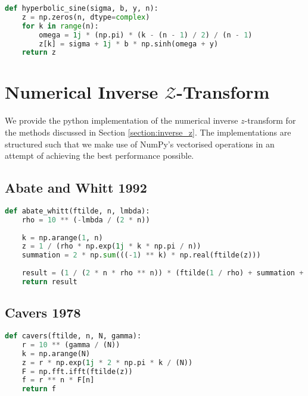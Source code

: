 \begin{appendices}
\begin{lstlisting}[language=Python, caption= Implementation of the conformal mapping (Equation \ref{equation:conformal_mapping}) from $-\frac{\pi}{2} \leq \omega \leq \frac{\pi}{2}$.]
def hyperbolic_sine(sigma, b, y, n):
    z = np.zeros(n, dtype=complex)
    for k in range(n):
        omega = 1j * (np.pi) * (k - (n - 1) / 2) / (n - 1)
        z[k] = sigma + 1j * b * np.sinh(omega + y)
    return z
\end{lstlisting}

\newpage
\section{Numerical Inverse $\mathcal{Z}$-Transform}
We provide the python implementation of the numerical inverse $z$-transform for the methods discussed in Section \ref{section:inverse_z}. The implementations are structured such that we make use of NumPy's vectorised operations in an attempt of achieving the best performance possible.

\subsection{Abate and Whitt 1992}
\begin{lstlisting}[language=Python, caption= Implementation of \citet{AbateWhitt1992a, AbateWhitt1992b}'s NIZT (Equation \ref{eq:aw_inversion}).]
def abate_whitt(ftilde, n, lmbda):
    rho = 10 ** (-lmbda / (2 * n))
    
    k = np.arange(1, n)
    z = 1 / (rho * np.exp(1j * k * np.pi / n))
    summation = 2 * np.sum(((-1) ** k) * np.real(ftilde(z)))
    
    result = (1 / (2 * n * rho ** n)) * (ftilde(1 / rho) + summation + ((-1) ** n) * ftilde(-1 / rho))
    return result
\end{lstlisting}

\subsection{Cavers 1978}
\begin{lstlisting}[language=Python, caption= Implementation of \citet{Cavers1978FFT}'s FFT NIZT (Equation \ref{cavers})]
def cavers(ftilde, n, N, gamma):
    r = 10 ** (gamma / (N))
    k = np.arange(N)
    z = r * np.exp(1j * 2 * np.pi * k / (N))
    F = np.fft.ifft(ftilde(z))
    f = r ** n * F[n]
    return f
\end{lstlisting}


\end{appendices}
